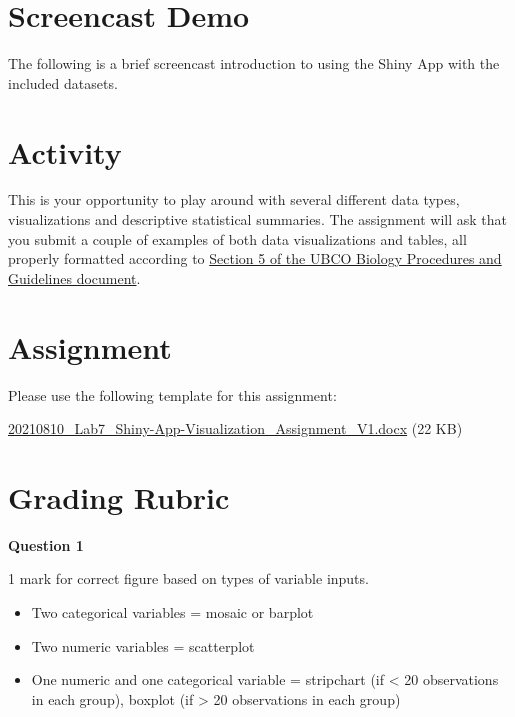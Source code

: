 \documentclass[
]{book}
\providecommand{\tightlist}{%
  \setlength{\itemsep}{0pt}\setlength{\parskip}{0pt}}
\begin{document}
\hypertarget{screencast-demo}{%
\section*{Screencast Demo}\label{screencast-demo}}

The following is a brief screencast introduction to using the Shiny App with the included datasets.

\hypertarget{activity}{%
\section*{Activity}\label{activity}}

This is your opportunity to play around with several different data types, visualizations and descriptive statistical summaries. The assignment will ask that you submit a couple of examples of both data visualizations and tables, all properly formatted according to \href{https://ubco-biology.github.io/Procedures-and-Guidelines/figures-tables.html}{Section 5 of the UBCO Biology Procedures and Guidelines document}.

\hypertarget{assignment-1}{%
\section*{Assignment}\label{assignment-1}}

Please use the following template for this assignment:

\href{files/20210810_Lab7_Shiny-App-Visualization_Assignment_V1.docx}{20210810\_Lab7\_Shiny-App-Visualization\_Assignment\_V1.docx} (22 KB)

\hypertarget{grading-rubric}{%
\section*{Grading Rubric}\label{grading-rubric}}

\textbf{Question 1}

1 mark for correct figure based on types of variable inputs.

\begin{itemize}
\tightlist
\item
  Two categorical variables = mosaic or barplot
\item
  Two numeric variables = scatterplot
\item
  One numeric and one categorical variable = stripchart (if \textless{} 20 observations in each group), boxplot (if \textgreater{} 20 observations in each group)
\end{itemize}
\end{document}
